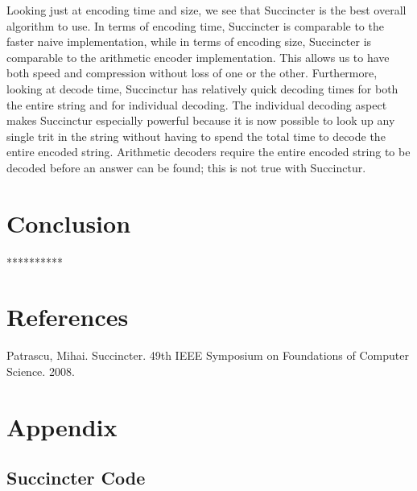 \documentclass{article}
\begin{document}
Looking just at encoding time and size, we see that Succincter is the best overall algorithm to use. In terms of encoding time, Succincter is comparable to the faster naive implementation, while in terms of encoding size, Succincter is comparable to the arithmetic encoder implementation. This allows us to have both speed and compression without loss of one or the other. Furthermore, looking at decode time, Succinctur has relatively quick decoding times for both the entire string and for individual decoding. The individual decoding aspect makes Succinctur especially powerful because it is now possible to look up any single trit in the string without having to spend the total time to decode the entire encoded string. Arithmetic decoders require the entire encoded string to be decoded before an answer can be found; this is not true with Succinctur.

\noindent \section{Conclusion}

\bigskip
\centerline{**********}

\noindent \section{References}
Patrascu, Mihai. Succincter. 49th IEEE Symposium on Foundations of Computer Science. 2008.

\noindent \section{Appendix}
\noindent \subsection{Succincter Code}




\end{document}
